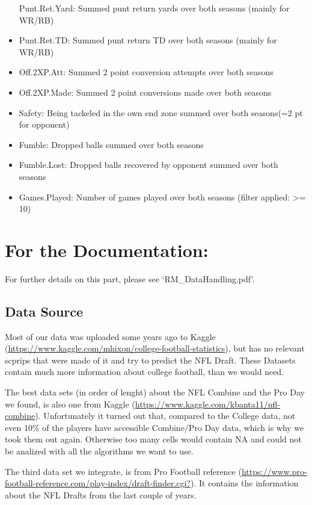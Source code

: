 \documentclass[]{article}
\begin{document}
\begin{itemize}
  Punt.Ret.Yard: Summed punt return yards over both seasons (mainly for
  WR/RB)
\item
  Punt.Ret.TD: Summed punt return TD over both seasons (mainly for
  WR/RB)
\item
  Off.2XP.Att: Summed 2 point conversion attempts over both seasons
\item
  Off.2XP.Made: Summed 2 point conversions made over both seasons
\item
  Safety: Being tackeled in the own end zone summed over both seasons(=2
  pt for opponent)
\item
  Fumble: Dropped balls summed over both seasons
\item
  Fumble.Lost: Dropped balls recovered by opponent summed over both
  seasons
\item
  Games.Played: Number of games played over both seasons (filter
  applied: \textgreater= 10)
\end{itemize}

\hypertarget{for-the-documentation}{%
\section{For the Documentation:}\label{for-the-documentation}}

For further details on this part, please see `RM\_DataHandling.pdf'.

\hypertarget{data-source-1}{%
\subsection{Data Source}\label{data-source-1}}

Most of our data was uploaded some years ago to Kaggle
(\url{https://www.kaggle.com/mhixon/college-football-statistics}), but
has no relevant scprips that were made of it and try to predict the NFL
Draft. These Datasets contain much more information about college
football, than we would need.

The best data sets (in order of lenght) about the NFL Combine and the
Pro Day we found, is also one from Kaggle
(\url{https://www.kaggle.com/kbanta11/nfl-combine}). Unfortunately it
turned out that, compared to the College data, not even 10\% of the
players have accessible Combine/Pro Day data, which is why we took them
out again. Otherwise too many cells would contain NA and could not be
analized with all the algorithms we want to use.

The third data set we integrate, is from Pro Football reference
(\url{https://www.pro-football-reference.com/play-index/draft-finder.cgi?}).
It contains the information about the NFL Drafts from the last couple of
years.
\end{document}
